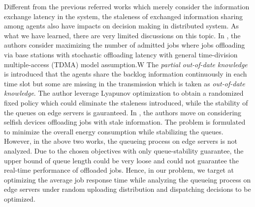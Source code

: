 Different from the previous referred works which merely consider the information exchange latency in the system, the staleness of exchanged information sharing among agents also have impacts on decision making in distributed system.
As what we have learned, there are very limited discussions on this topic.
In \cite{JSAC17-LyuX}, the authors consider maximizing the number of admitted jobs where jobs offloading via base stations with stochastic offloading latency with general time-division multiple-access (TDMA) model assumption.W
The \emph{partial out-of-date knowledge} is introduced that the agents share the backlog information continuously in each time slot but some are missing in the transmission which is taken as \emph{out-of-date knowledge}.
The author leverage Lyapunov optimization to obtain a randomized fixed policy which could eliminate the staleness introduced, while the stability of the queues on edge servers is gauranteed. 
In \cite{TWC18-LyuX}, the authors move on considering selfish devices offloading jobs with stale information.
The problem is formulated to minimize the overall energy consumption while stabilizing the queues.
However, in the above two works, the queueing process on edge servers is not analyzed.
Due to the chosen objectives with only queue-stability guarantee, the upper bound of queue length could be very loose and could not guarantee the real-time performance of offloaded jobs.
Hence, in our problem, we target at optimizing the average job response time while analyzing the queueing process on edge servers under random uploading distribution and dispatching decisions to be optimized.

